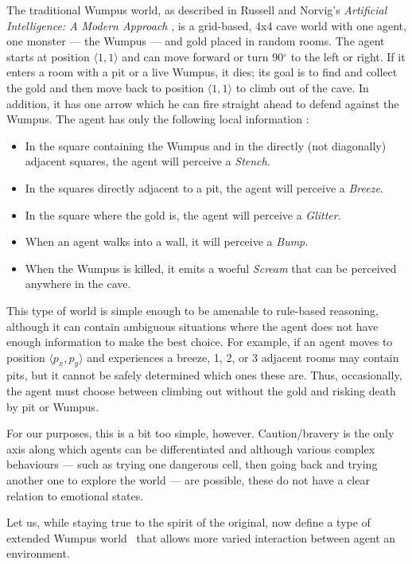 The traditional Wumpus world, as described in Russell and Norvig's {\em Artificial Intelligence: A Modern Approach} \cite[p. 236]{norvig}, is a grid-based, 4x4 cave world with one agent, one monster --- the Wumpus --- and gold placed in random rooms. The agent starts at position $\langle 1,1\rangle$ and can move forward or turn 90$^\circ$ to the left or right. If it enters a room with a pit or a live Wumpus, it dies; its goal is to find and collect the gold and then move back to position $\langle 1,1\rangle$ to climb out of the cave. In addition, it has one arrow which he can fire straight ahead to defend against the Wumpus. The agent has only the following local information \cite[p. 237]{norvig}:
\begin{itemize}
	\item In the square containing the Wumpus and in the directly (not diagonally) adjacent squares, the agent will perceive a {\em Stench}.
	\item In the squares directly adjacent to a pit, the agent will perceive a {\em Breeze}.
	\item In the square where the gold is, the agent will perceive a {\em Glitter}.
	\item When an agent walks into a wall, it will perceive a {\em Bump}.
	\item When the Wumpus is killed, it emits a woeful {\em Scream} that can be perceived anywhere in the cave.
\end{itemize}

This type of world is simple enough to be amenable to rule-based reasoning, although it can contain ambiguous situations where the agent does not have enough information to make the best choice. For example, if an agent moves to position $\langle p_x,p_y \rangle$ and experiences a breeze, 1, 2, or 3 adjacent rooms may contain pits, but it cannot be safely determined which ones these are. Thus,  occasionally, the agent must choose between climbing out without the gold and risking death by pit or Wumpus.

For our purposes, this is a bit too simple, however. Caution/bravery is the only axis along which agents can be differentiated and although various complex behaviours --- such as trying one dangerous cell, then going back and trying another one to explore the world --- are possible, these do not have a clear relation to emotional states.

Let us, while staying true to the spirit of the original, now define a type of extended Wumpus world \wext\ that allows more varied interaction between agent an environment.

